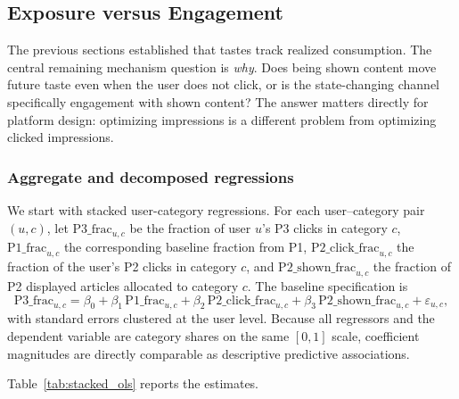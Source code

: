 \documentclass[11pt]{article}
\begin{document}
\subsection{Exposure versus Engagement}
\label{sec:exposure}

The previous sections established that tastes track realized consumption. The central remaining mechanism question is \emph{why}. Does being shown content move future taste even when the user does not click, or is the state-changing channel specifically engagement with shown content? The answer matters directly for platform design: optimizing impressions is a different problem from optimizing clicked impressions.

\subsubsection{Aggregate and decomposed regressions}

We start with stacked user-category regressions. For each user--category pair $(u,c)$, let $\text{P3\_frac}_{u,c}$ be the fraction of user $u$'s P3 clicks in category $c$, $\text{P1\_frac}_{u,c}$ the corresponding baseline fraction from P1, $\text{P2\_click\_frac}_{u,c}$ the fraction of the user's P2 clicks in category $c$, and $\text{P2\_shown\_frac}_{u,c}$ the fraction of P2 displayed articles allocated to category $c$. The baseline specification is
\[
\text{P3\_frac}_{u,c}
=
\beta_0
+
\beta_1\,\text{P1\_frac}_{u,c}
+
\beta_2\,\text{P2\_click\_frac}_{u,c}
+
\beta_3\,\text{P2\_shown\_frac}_{u,c}
+
\varepsilon_{u,c},
\]
with standard errors clustered at the user level. Because all regressors and the dependent variable are category shares on the same $[0,1]$ scale, coefficient magnitudes are directly comparable as descriptive predictive associations.

Table~\ref{tab:stacked_ols} reports the estimates.
\end{document}
